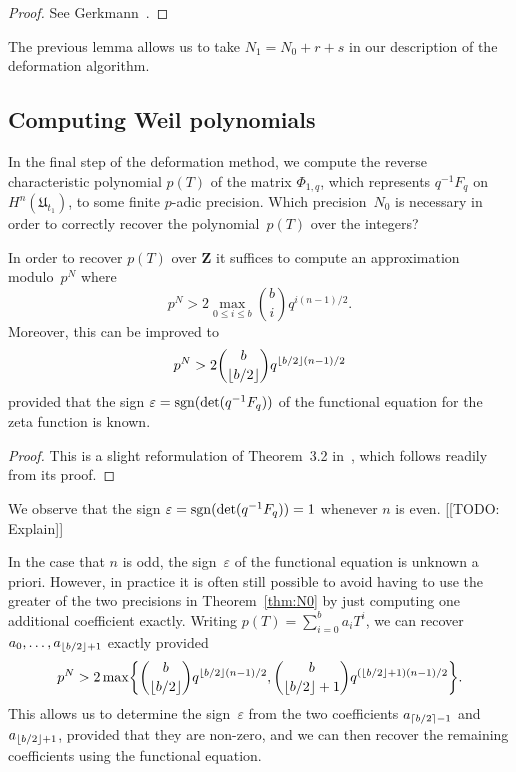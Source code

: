 \begin{proof} 
See Gerkmann~\citep[Lemma~3.3, Lemma~3.4]{Gerkmann2007}.
\end{proof}

The previous lemma allows us to take 
$N_1 = N_0 + r + s$ in our description of the deformation 
algorithm.

\subsection{Computing Weil polynomials}

In the final step of the deformation method, we compute the 
reverse characteristic polynomial $p(T)$ of the matrix $\Phi_{1,q}$, 
which represents $q^{-1} F_q$ on $H^n(\mathfrak{U}_{t_1})$, to some finite 
$p$-adic precision.  Which precision~$N_0$ is necessary in order to 
correctly recover the polynomial~$p(T)$ over the integers?

\begin{thm} \label{thm:N0}
In order to recover $p(T)$ over $\mathbf{Z}$ it suffices to compute 
an approximation modulo~$p^N$ where 
\begin{equation*}
p^N > 2 \max_{0 \leq i \leq b} \binom{b}{i} q^{i (n-1) / 2}.
\end{equation*}
Moreover, this can be improved to 
\begin{equation*}
p^N > 2 \binom{b}{\left\lfloor b/2\right\rfloor} q^{\left\lfloor b/2\right\rfloor (n-1) / 2}
\end{equation*}
provided that the sign $\varepsilon = \operatorname{sgn}(\det(q^{-1} F_q))$ of the 
functional equation for the zeta function is known.
\end{thm}

\begin{proof}
This is a slight reformulation of {Theorem~3.2} in~\citep{Gerkmann2007}, 
which follows readily from its proof.
\end{proof}

\begin{rem}
We observe that the sign $\varepsilon = \operatorname{sgn}(\det(q^{-1} F_q)) = 1$ 
whenever $n$ is even.  [[TODO:  Explain]]
\end{rem}

\begin{rem}
In the case that $n$ is odd, the sign~$\varepsilon$ of the functional 
equation is unknown a priori.  However, in practice it is often still 
possible to avoid having to use the greater of the two precisions in 
Theorem~\ref{thm:N0} by just computing one additional coefficient 
exactly.  Writing $p(T) = \sum_{i=0}^{b} a_i T^i$, we can recover 
$a_0, \dotsc, a_{\left\lfloor b/2\right\rfloor+1}$ exactly provided 
\begin{equation*}
p^N > 2 \max\biggl\{\binom{b}{\left\lfloor b/2\right\rfloor} q^{\left\lfloor b/2\right\rfloor (n-1) / 2}, 
                   \binom{b}{\left\lfloor b/2\right\rfloor+1} q^{(\left\lfloor b/2\right\rfloor+1) (n-1)/2} \biggr\}.
\end{equation*}
This allows us to determine the sign~$\varepsilon$ from the two 
coefficients $a_{\left\lceil b/2\right\rceil-1}$ and $a_{\left\lfloor b/2\right\rfloor+1}$, provided 
that they are non-zero, and we can then recover the remaining 
coefficients using the functional equation.
\end{rem}

